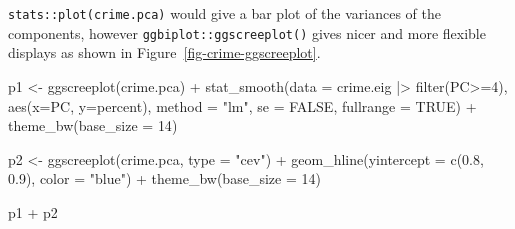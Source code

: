 \documentclass[
  letterpaper,
  10pt,
  krantz2]{krantz}
\makeatletter
\newenvironment{Shaded}{\begin{snugshade}}{\end{snugshade}}
\newcommand{\AttributeTok}[1]{\textcolor[rgb]{0.40,0.45,0.13}{#1}}
\newcommand{\ConstantTok}[1]{\textcolor[rgb]{0.56,0.35,0.01}{#1}}
\newcommand{\DecValTok}[1]{\textcolor[rgb]{0.68,0.00,0.00}{#1}}
\newcommand{\FloatTok}[1]{\textcolor[rgb]{0.68,0.00,0.00}{#1}}
\newcommand{\FunctionTok}[1]{\textcolor[rgb]{0.28,0.35,0.67}{#1}}
\newcommand{\NormalTok}[1]{\textcolor[rgb]{0.00,0.23,0.31}{#1}}
\newcommand{\OtherTok}[1]{\textcolor[rgb]{0.00,0.23,0.31}{#1}}
\newcommand{\SpecialCharTok}[1]{\textcolor[rgb]{0.37,0.37,0.37}{#1}}
\newcommand{\StringTok}[1]{\textcolor[rgb]{0.13,0.47,0.30}{#1}}
\newenvironment{kframe}{%
  \medskip{}
  \setlength{\fboxsep}{.8em}
  \def\at@end@of@kframe{}%
  \ifinner\ifhmode%
  \def\at@end@of@kframe{\end{minipage}}%
  \begin{minipage}{\columnwidth}%
  \fi\fi%
  \def\FrameCommand##1{\hskip\@totalleftmargin \hskip-\fboxsep
  \colorbox{shadecolor}{##1}\hskip-\fboxsep
      \hskip-\linewidth \hskip-\@totalleftmargin \hskip\columnwidth}%
  \MakeFramed {\advance\hsize-\width
    \@totalleftmargin\z@ \linewidth\hsize
    \@setminipage}}%
{\par\unskip\endMakeFramed%
  \at@end@of@kframe}
\renewenvironment{Shaded}{\begin{kframe}}{\end{kframe}}
\makeatother
\begin{document}
\texttt{stats::plot(crime.pca)} would give a bar plot of the variances
of the components, however \texttt{ggbiplot::ggscreeplot()} gives nicer
and more flexible displays as shown in
Figure~\ref{fig-crime-ggscreeplot}.

\begin{Shaded}
\begin{Highlighting}[]
\NormalTok{p1 }\OtherTok{\textless{}{-}} \FunctionTok{ggscreeplot}\NormalTok{(crime.pca) }\SpecialCharTok{+}
  \FunctionTok{stat\_smooth}\NormalTok{(}\AttributeTok{data =}\NormalTok{ crime.eig }\SpecialCharTok{|\textgreater{}} \FunctionTok{filter}\NormalTok{(PC}\SpecialCharTok{\textgreater{}=}\DecValTok{4}\NormalTok{), }
              \FunctionTok{aes}\NormalTok{(}\AttributeTok{x=}\NormalTok{PC, }\AttributeTok{y=}\NormalTok{percent), }\AttributeTok{method =} \StringTok{"lm"}\NormalTok{, }
              \AttributeTok{se =} \ConstantTok{FALSE}\NormalTok{,}
              \AttributeTok{fullrange =} \ConstantTok{TRUE}\NormalTok{) }\SpecialCharTok{+}
  \FunctionTok{theme\_bw}\NormalTok{(}\AttributeTok{base\_size =} \DecValTok{14}\NormalTok{)}

\NormalTok{p2 }\OtherTok{\textless{}{-}} \FunctionTok{ggscreeplot}\NormalTok{(crime.pca, }\AttributeTok{type =} \StringTok{"cev"}\NormalTok{) }\SpecialCharTok{+}
  \FunctionTok{geom\_hline}\NormalTok{(}\AttributeTok{yintercept =} \FunctionTok{c}\NormalTok{(}\FloatTok{0.8}\NormalTok{, }\FloatTok{0.9}\NormalTok{), }\AttributeTok{color =} \StringTok{"blue"}\NormalTok{) }\SpecialCharTok{+}
  \FunctionTok{theme\_bw}\NormalTok{(}\AttributeTok{base\_size =} \DecValTok{14}\NormalTok{)}

\NormalTok{p1 }\SpecialCharTok{+}\NormalTok{ p2}
\end{Highlighting}
\end{Shaded}
\end{document}
